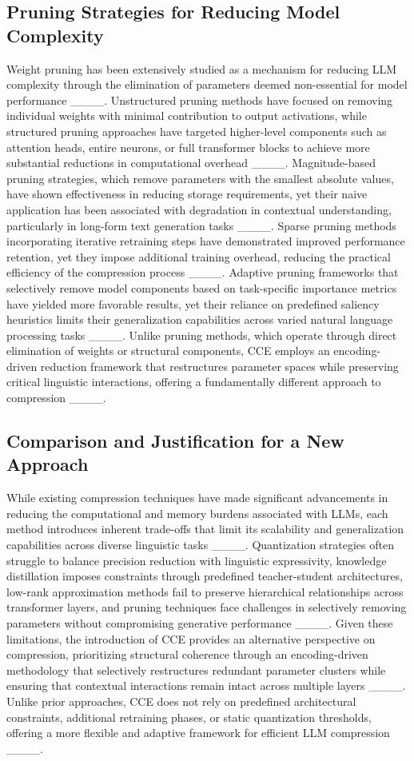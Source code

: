 \subsection{Pruning Strategies for Reducing Model Complexity}
Weight pruning has been extensively studied as a mechanism for reducing LLM complexity through the elimination of parameters deemed non-essential for model performance ____. Unstructured pruning methods have focused on removing individual weights with minimal contribution to output activations, while structured pruning approaches have targeted higher-level components such as attention heads, entire neurons, or full transformer blocks to achieve more substantial reductions in computational overhead ____. Magnitude-based pruning strategies, which remove parameters with the smallest absolute values, have shown effectiveness in reducing storage requirements, yet their naive application has been associated with degradation in contextual understanding, particularly in long-form text generation tasks ____. Sparse pruning methods incorporating iterative retraining steps have demonstrated improved performance retention, yet they impose additional training overhead, reducing the practical efficiency of the compression process ____. Adaptive pruning frameworks that selectively remove model components based on task-specific importance metrics have yielded more favorable results, yet their reliance on predefined saliency heuristics limits their generalization capabilities across varied natural language processing tasks ____. Unlike pruning methods, which operate through direct elimination of weights or structural components, CCE employs an encoding-driven reduction framework that restructures parameter spaces while preserving critical linguistic interactions, offering a fundamentally different approach to compression ____.

\subsection{Comparison and Justification for a New Approach}
While existing compression techniques have made significant advancements in reducing the computational and memory burdens associated with LLMs, each method introduces inherent trade-offs that limit its scalability and generalization capabilities across diverse linguistic tasks ____. Quantization strategies often struggle to balance precision reduction with linguistic expressivity, knowledge distillation imposes constraints through predefined teacher-student architectures, low-rank approximation methods fail to preserve hierarchical relationships across transformer layers, and pruning techniques face challenges in selectively removing parameters without compromising generative performance ____. Given these limitations, the introduction of CCE provides an alternative perspective on compression, prioritizing structural coherence through an encoding-driven methodology that selectively restructures redundant parameter clusters while ensuring that contextual interactions remain intact across multiple layers ____. Unlike prior approaches, CCE does not rely on predefined architectural constraints, additional retraining phases, or static quantization thresholds, offering a more flexible and adaptive framework for efficient LLM compression ____.
